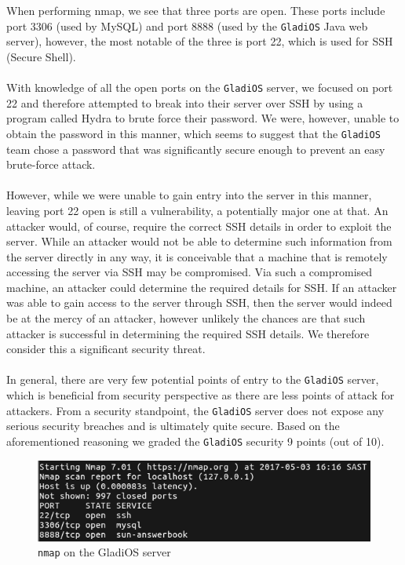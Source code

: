 \documentclass[12pt,a4paper,titlepage]{article}
\begin{document}
When performing nmap, we see that three ports are open. These ports include port
3306 (used by MySQL) and port 8888 (used by the \texttt{GladiOS} Java web server),
however, the most notable of the three is port 22, which is used for SSH
(Secure Shell).
\\\\
With knowledge of all the open ports on the \texttt{GladiOS} server, we focused on port
22 and therefore attempted to break into their server over SSH by using a
program called Hydra to brute force their password. We were,
however, unable to obtain the password in this manner, which seems to suggest
that the \texttt{GladiOS} team chose a password that was significantly secure enough to
prevent an easy brute-force attack.
\\\\
However, while we were unable to gain entry into the server in this manner,
leaving port 22 open is still a vulnerability, a potentially major one at that.
An attacker would, of course, require the correct SSH details in order to
exploit the server. While an attacker would not be able to determine such
information from the server directly in any way, it is conceivable that a
machine that is remotely accessing the server via SSH may be compromised. Via
such a compromised machine, an attacker could determine the required details
for SSH. If an attacker was able to gain access to the server through SSH, then
the server would indeed be at the mercy of an attacker, however unlikely the
chances are that such attacker is successful in determining the required SSH
details. We therefore consider this a significant security threat.
\\\\
In general, there are very few potential points of entry to the \texttt{GladiOS} server,
which is beneficial from security perspective as there are less points of attack
for attackers. From a security standpoint, the \texttt{GladiOS} server does not expose
any serious security breaches and is ultimately quite secure. Based on the
aforementioned reasoning we graded the \texttt{GladiOS} security 9 points (out of 10).

\begin{figure}[!ht]
	\includegraphics[width=\textwidth]{image.png}
	\caption{\texttt{nmap} on the GladiOS server}
	\label{}
\end{figure}
\end{document}
